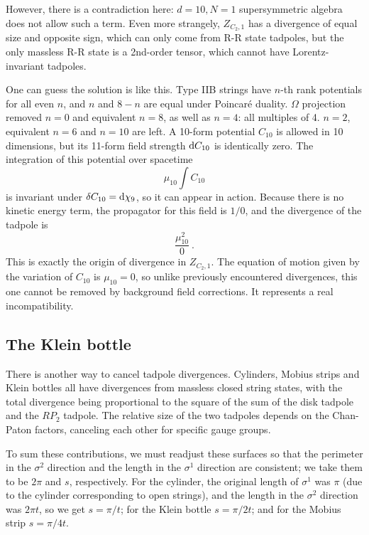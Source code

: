 	However, there is a contradiction here: $d=10, N=1$ supersymmetric algebra does not allow such a term. Even more strangely, $Z_{C_{2},1}$ has a divergence of equal size and opposite sign, which can only come from R-R state tadpoles, but the only massless R-R state is a 2nd-order tensor, which cannot have Lorentz-invariant tadpoles.
	
	One can guess the solution is like this. Type IIB strings have $n$-th rank potentials for all even $n$, and $n$ and $8-n$ are equal under Poincaré duality. $\Omega$ projection removed $n=0$ and equivalent $n=8$, as well as $n=4$: all multiples of 4. $n=2$, equivalent $n=6$ and $n=10$ are left. A 10-form potential $C_{10}$ is allowed in 10 dimensions, but its 11-form field strength $\mathrm{d} C_{10}$ is identically zero. The integration of this potential over spacetime
	\begin{equation}
		\mu_{10}\int C_{10} \label{10.8.5}
	\end{equation}
	is invariant under $\delta C_{10}=\mathrm{d} \chi_{9}$, so it can appear in action. Because there is no kinetic energy term, the propagator for this field is $1/0$, and the divergence of the tadpole is
	\begin{equation}
		\frac{\mu^{2}_{10}}{0} \:. \label{10.8.6}
	\end{equation}
	This is exactly the origin of divergence in $Z_{C_{2},1}$. The equation of motion given by the variation of $C_{10}$ is $\mu_{10}=0$, so unlike previously encountered divergences, this one cannot be removed by background field corrections. It represents a real incompatibility.
	
	\subsection*{The Klein bottle}
	
	There is another way to cancel tadpole divergences. Cylinders, Mobius strips and Klein bottles all have divergences from massless closed string states, with the total divergence being proportional to the square of the sum of the disk tadpole and the $RP_{2}$ tadpole. The relative size of the two tadpoles depends on the Chan-Paton factors, canceling each other for specific gauge groups.
	
	To sum these contributions, we must readjust these surfaces so that the perimeter in the $\sigma^{2}$ direction and the length in the $\sigma^{1}$ direction are consistent; we take them to be $2\pi$ and $s$, respectively. For the cylinder, the original length of $\sigma^{1}$ was $\pi$ (due to the cylinder corresponding to open strings), and the length in the $\sigma^{2}$ direction was $2\pi t$, so we get $s=\pi/t$; for the Klein bottle $s=\pi/2t$; and for the Mobius strip $s=\pi/4t$. 
	
